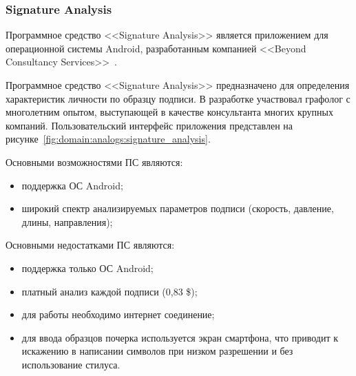 \subsubsection{Signature Analysis}
\label{sub:domain:analogs:signature_analysis}

Программное средство <<Signature Analysis>> является приложением для операционной системы Android, разработанным компанией <<Beyond Consultancy Services>>~\cite{analogs_signature_analysis}.

Программное средство <<Signature Analysis>> предназначено для определения характеристик личности по образцу подписи. В разработке участвовал графолог с многолетним опытом, выступающей в качестве консультанта многих крупных компаний.  Пользовательский интерфейс приложения представлен на рисунке~\ref{fig:domain:analogs:signature_analysis}.

Основными возможностями ПС являются:
\begin{itemize}
  \item поддержка ОС Android;
  \item широкий спектр анализируемых параметров подписи (скорость, давление, длины, направления);
\end{itemize}

Основными недостатками ПС являются:
\begin{itemize}
  \item поддержка только ОС Android;
  \item платный анализ каждой подписи (0,83 \$);
  \item для работы необходимо интернет соединение;
  \item для ввода образцов почерка используется экран смартфона, что приводит к искажению в написании символов при низком разрешении и без использование стилуса.
\end{itemize}

